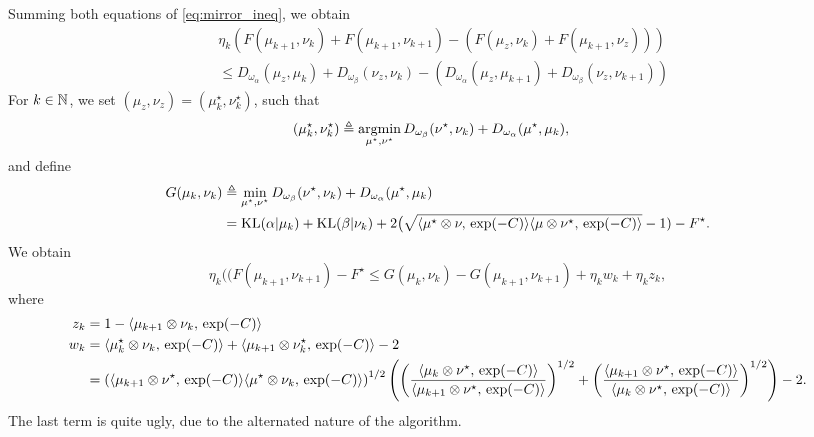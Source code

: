 \documentclass[a4paper, 10pt]{article}
\begin{document}
Summing both equations of \eqref{eq:mirror_ineq}, we obtain
\begin{align}
    &\eta_k (F(\mu_{k+1},\nu_k) + F(\mu_{k+1},\nu_{k+1})
    - (F(\mu_z, \nu_k) + F(\mu_{k+1}, \nu_z))) \\ 
    &\leq 
    D_{\omega_\alpha}(\mu_z, \mu_k)
    + D_{\omega_\beta}(\nu_z, \nu_k)
    - (D_{\omega_\alpha}(\mu_z, \mu_{k+1}) 
     + D_{\omega_\beta}(\nu_z, \nu_{k+1}))
\end{align}
For $k \in \mathbb{N}$, we set $(\mu_z, \nu_z) = (\mu^\star_k, \nu^\star_k)$, such that
\begin{align}
    (\mu^\star_k, \nu^\star_k) &\triangleq \operatorname*{argmin}_{\mu^\star, \nu^\star} D_{\omega_\beta}
    (\nu^\star, \nu_k) + D_{\omega_\alpha}(\mu^\star, \mu_k),
\end{align}
and define
\begin{align}
    G(\mu_k, \nu_k) &\triangleq \min_{\mu^\star, \nu^\star} 
    D_{\omega_\beta}
    (\nu^\star, \nu_k) + D_{\omega_\alpha}(\mu^\star, \mu_k) \\
    &= \text{KL}(\alpha|\mu_k) + \text{KL}(\beta|\nu_k) 
    + 2 \big( \sqrt{\langle \mu^\star \otimes \nu,\,\exp(-C)\rangle 
    \langle \mu \otimes \nu^\star,\,\exp(-C)\rangle} - 1) - F^\star. \\
\end{align}
We obtain
\begin{equation}
    \eta_k (
        (F(\mu_{k+1}, \nu_{k+1}) - F^\star
        \leq G(\mu_k, \nu_{k}) - G(\mu_{k+1}, \nu_{k+1}) + \eta_k w_k + \eta_k z_k,
\end{equation}
where
\begin{align}
    z_k &= 1 - \langle \mu_{k+1} \otimes \nu_k,\,\exp(-C)\rangle \\
    w_k &= \langle \mu_k^\star \otimes \nu_k,\,\exp(-C)\rangle
    + \langle \mu_{k+1} \otimes \nu_k^\star,\,\exp(-C)\rangle - 2\\
    &=\left(
    \langle \mu_{k+1} \otimes \nu^\star,\,\exp(-C)\rangle
    \langle \mu^\star \otimes \nu_k,\,\exp(-C)\rangle
    \right)^{1/2}
    \left(
        \left(\frac{
            \langle \mu_k \otimes \nu^\star,\,\exp(-C)\rangle
        }
        {
            \langle \mu_{k+1} \otimes \nu^\star,\,\exp(-C)\rangle
        }\right)^{1/2}
        + 
        \left(\frac{
            \langle \mu_{k+1} \otimes \nu^\star,\,\exp(-C)\rangle
        }
        {
            \langle \mu_k \otimes \nu^\star,\,\exp(-C)\rangle
        }
        \right)^{1/2}
    \right) - 2.
\end{align}
The last term is quite ugly, due to the alternated nature of the algorithm.
\end{document}

